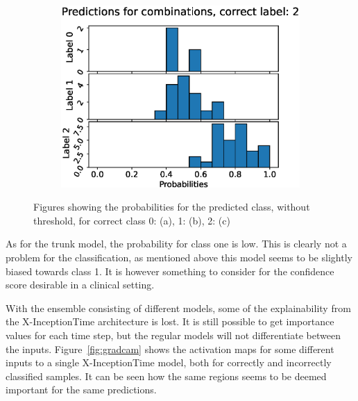 \begin{figure}
\begin{subfigure}[t]{0.33\textwidth}
    \includegraphics[width=\textwidth]{files/figs/res/femval/pc2.eps}
    \caption{}
    \label{fig:femval-pc2}
  \end{subfigure}

  \caption{Figures showing the probabilities for the predicted class, without threshold, for correct class 0: (a), 1: (b), 2: (c)}
  \label{fig:femval-pc}
\end{figure}

As for the trunk model, the probability for class one is low. This is clearly not a problem for the classification, as mentioned above this model seems to be slightly biased towards class 1. It is however something to consider for the confidence score desirable in a clinical setting.


With the ensemble consisting of different models, some of the explainability from the X-InceptionTime architecture is lost. It is still possible to get importance values for each time step, but the regular models will not differentiate between the inputs. Figure~\ref{fig:gradcam} shows the activation maps for some different inputs to a single X-InceptionTime model, both for correctly and incorrectly classified samples. It can be seen how the same regions seems to be deemed important for the same predictions.%

